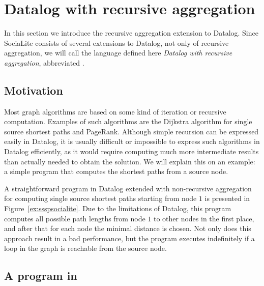 \section{Datalog with recursive aggregation}\label{s:recaggr}

In this section we introduce the recursive aggregation extension to Datalog. Since SociaLite consists of several extensions to Datalog, not only of recursive aggregation, we will call the language defined here \emph{Datalog with recursive aggregation}, abbreviated \datalogra.

\subsection{Motivation}
Most graph algorithms are based on some kind of iteration or recursive computation. Examples of such algorithms are the Dijkstra algorithm for single source shortest paths and PageRank. Although simple recursion can be expressed easily in Datalog, it is usually difficult or impossible to express such algorithms in Datalog efficiently, as it would require computing much more intermediate results than actually needed to obtain the solution. We will explain this on an example: a simple program that computes the shortest paths from a source node.

A straightforward program in Datalog extended with non-recursive aggregation for computing single source shortest paths starting from node $1$ is presented in Figure~\ref{ex:ssspsocialite}. Due to the limitations of Datalog, this program computes all possible path lengths from node $1$ to other nodes in the first place, and after that for each node the minimal distance is chosen. Not only does this approach result in a bad performance, but the program executes indefinitely if a loop in the graph is reachable from the source node.


\subsection{A program in \datalogra}

